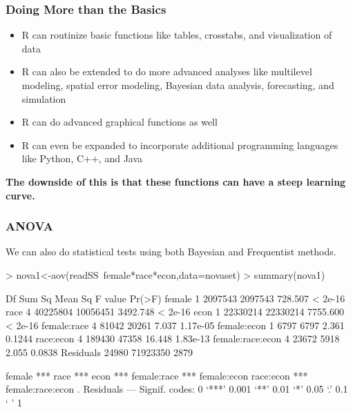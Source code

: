 \documentclass[12pt,handout]{beamer}
\begin{document}
\begin{frame}
\frametitle{Doing More than the Basics}
  \begin{itemize}
  \item R can routinize basic functions like tables, crosstabs, and visualization of data
  \item R can also be extended to do more advanced analyses like multilevel modeling, spatial error modeling, Bayesian data analysis, forecasting, and simulation
  \item R can do advanced graphical functions as well
  \item R can even be expanded to incorporate additional programming languages like Python, C++, and Java
  \end{itemize}
\textbf{The downside of this is that these functions can have a steep learning curve.}
\end{frame}

\begin{frame}[containsverbatim]
\frametitle{ANOVA}
We can also do statistical tests using both Bayesian and Frequentist methods.
\begin{Schunk}
\begin{Sinput}
> nova1<-aov(readSS~female*race*econ,data=novaset)
> summary(nova1)
\end{Sinput}
\begin{Soutput}
                    Df   Sum Sq  Mean Sq  F value   Pr(>F)
female               1  2097543  2097543  728.507  < 2e-16
race                 4 40225804 10056451 3492.748  < 2e-16
econ                 1 22330214 22330214 7755.600  < 2e-16
female:race          4    81042    20261    7.037 1.17e-05
female:econ          1     6797     6797    2.361   0.1244
race:econ            4   189430    47358   16.448 1.83e-13
female:race:econ     4    23672     5918    2.055   0.0838
Residuals        24980 71923350     2879                  
                    
female           ***
race             ***
econ             ***
female:race      ***
female:econ         
race:econ        ***
female:race:econ .  
Residuals           
---
Signif. codes:  0 ‘***’ 0.001 ‘**’ 0.01 ‘*’ 0.05 ‘.’ 0.1 ‘ ’ 1 
\end{Soutput}
\end{Schunk}
\end{frame}
\end{document}
